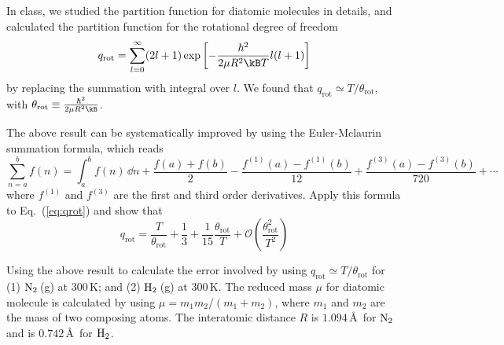 \bigskip
{}
In class, we studied the partition function for diatomic molecules
in details, and calculated the partition function for the rotational degree of freedom
\begin{equation}
q_\text{rot} = 
\sum_{l=0}^\infty (2l+1) \exp\left[-\frac{\hbar^2}{2\mu R^2 \kB T}l(l+1)\right] 
\label{eq:qrot}
\end{equation}
by replacing the summation with integral over $l$.
We found that $q_\text{rot} \simeq T/\theta_\text{rot}$,
with $\theta_\text{rot} \equiv \frac{\hbar^2}{2\mu R^2 \kB}$.

\smallskip\subp
The above result can be systematically improved by using
the Euler-Mclaurin summation formula, which reads
$$ \sum_{n=a}^{b} f(n) = \int_a^b f(n)\, \dd n
+ \frac{f(a) + f(b)}{2}
- \frac{f^{(1)}(a) - f^{(1)}(b)}{12}
+ \frac{f^{(3)}(a) - f^{(3)}(b)}{720}
+ \cdots $$
where $f^{(1)}$ and $f^{(3)}$ are the first and third order derivatives.
Apply this formula to Eq.~(\ref{eq:qrot}) and show that
$$ q_\text{rot} =
\frac{T}{\theta_\text{rot}} + \frac{1}{3} + \frac{1}{15} \frac{\theta_\text{rot}}{T} +
\mathcal{O}\left(\frac{\theta_\text{rot}^2}{T^2}\right) $$

\smallskip\subp
Using the above result to calculate the error involved by
using $q_\text{rot} \simeq T/\theta_\text{rot}$ for
(1) $\rm N_2$\,(g) at 300\,K;
and (2) $\rm H_2$\,(g) at 300\,K.
The reduced mass $\mu$ for diatomic molecule is calculated by using
$\mu = m_1 m_2 / (m_1 + m_2)$, where $m_1$ and $m_2$ are the mass of two composing atoms.
The interatomic distance $R$ is $1.094$\,\AA\ for $\rm N_2$ and
is $0.742$\,\AA\ for $\rm H_2$.


